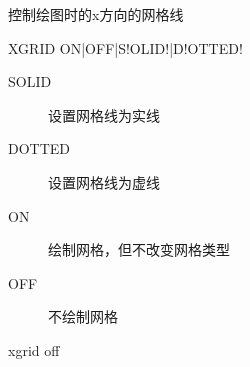 \label{cmd:xgrid}

控制绘图时的x方向的网格线

\begin{SACSTX}
XGRID ON|OFF|S!OLID!|D!OTTED!
\end{SACSTX}

\begin{description}
\item [SOLID] 设置网格线为实线
\item [DOTTED] 设置网格线为虚线
\item [ON] 绘制网格，但不改变网格类型
\item [OFF] 不绘制网格
\end{description}

\begin{SACDFT}
xgrid off
\end{SACDFT}
